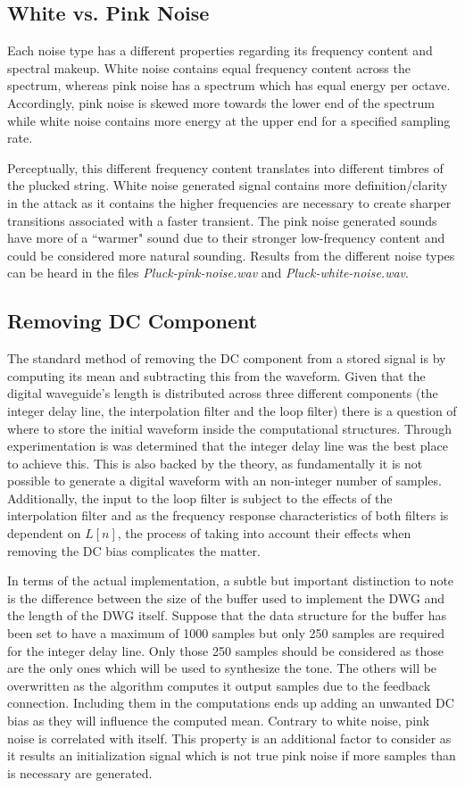 \documentclass[../main.tex]{subfiles}
\begin{document}
\subsection{White vs. Pink Noise}
Each noise type has a different properties regarding its frequency content and spectral makeup. White noise contains equal frequency content across the spectrum, whereas pink noise has a spectrum which has equal energy per octave. Accordingly, pink noise is skewed more towards the lower end of the spectrum while white noise contains more energy at the upper end for a specified sampling rate. 

Perceptually, this different frequency content translates into different timbres of the plucked string. White noise generated signal contains more definition/clarity in the attack as it contains the higher frequencies are necessary to create sharper transitions associated with a faster transient. The pink noise generated sounds have more of a ``warmer" sound due to their stronger low-frequency content and could be considered more natural sounding. Results from the different noise types can be heard in the files \emph{Pluck-pink-noise.wav} and \emph{Pluck-white-noise.wav}.

\subsection{Removing DC Component}
The standard method of removing the DC component from a stored signal is by computing its mean and subtracting this from the waveform. Given that the digital waveguide's length is distributed across three different components (the integer delay line, the interpolation filter and the loop filter) there is a question of where to store the initial waveform inside the computational structures. Through experimentation is was determined that the integer delay line was the best place to achieve this. This is also backed by the theory, as fundamentally it is not possible to generate a digital waveform with an non-integer number of samples. Additionally, the input to the loop filter is subject to the effects of the interpolation filter and as the frequency response characteristics of both filters is dependent on $L[n]$, the process of taking into account their effects when removing the DC bias complicates the matter.

In terms of the actual implementation, a subtle but important distinction to note is the difference between the size of the buffer used to implement the DWG and the length of the DWG itself. Suppose that the data structure for the buffer has been set to have a maximum of 1000 samples but only 250 samples are required for the integer delay line. Only those 250 samples should be considered as those are the only ones which will be used to synthesize the tone. The others will be overwritten as the algorithm computes it output samples due to the feedback connection. Including them in the computations ends up adding an unwanted DC bias as they will influence the computed mean. Contrary to white noise, pink noise is correlated with itself. This property is an additional factor to consider as it results an initialization signal which is not true pink noise if more samples than is necessary are generated.
\end{document}
